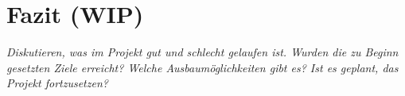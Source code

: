 \newpage
\section{Fazit (WIP)}\label{sec:conclusion}
\textit{Diskutieren, was im Projekt gut und schlecht gelaufen ist. Wurden die zu Beginn gesetzten Ziele erreicht? Welche Ausbaumöglichkeiten gibt es? Ist es geplant, das Projekt fortzusetzen?}